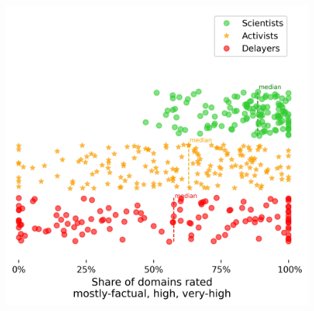 \documentclass{article}
\begin{document}
\begin{figure}[ht]
\begin{minipage}[b]{0.3\linewidth}
  \centering
    \includegraphics[width=.8\linewidth]{../figures/positive_rating_climate_agg_2022_07_29.jpg} 
    \caption{} 
  \end{minipage}
\end{figure}

{}

\end{document}
